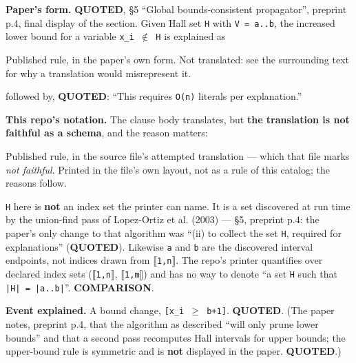 \documentclass[10pt,a4paper]{article}
\newcommand{\provtag}[2]{{\small\sffamily\bfseries\textcolor{#1}{#2}}}
\newenvironment{pubblock}{%
  \par\smallskip
  \def\FrameCommand{\textcolor{litbar}{\vrule width 2.5pt}\hspace{9pt}}%
  \MakeFramed{\advance\hsize-\width\FrameRestore}}%
  {\endMakeFramed\par\smallskip}
\newcommand{\litsub}[1]{\par\smallskip{\sffamily\bfseries\textcolor{litbar}{#1}\par}}
\newcommand{\rulekind}[1]{\par{\small\sffamily\textcolor{litbar}{#1}\par}}
\newcommand{\litline}[1]{\noindent
  \resizebox{\ifdim\width>\linewidth\linewidth\else\width\fi}{!}{#1}\par}
\begin{document}
\begin{pubblock}
\par\smallskip
\litsub{Rule 2 --- bounds-consistent propagator (Hall interval)}
\textbf{Paper's form.} \provtag{tagquoted}{QUOTED}, \S{}5 ``Global bounds-consistent propagator'', preprint p.4, final display of the section. Given Hall set \texttt{H} with \texttt{V = a..b}, the increased lower bound for a variable \texttt{x\_i $\notin$ H} is explained as

\rulekind{Published rule, in the paper's own form. Not translated: see the surrounding text for why a translation would misrepresent it.}
{\raggedright
\litline{\ttfamily\small [x\_i $\geq$ a] $\wedge$ $\bigwedge$\_\{h$\in$H\} ([x\_h $\geq$ a] $\wedge$ [x\_h $\leq$ b]) $\rightarrow$ [x\_i $\geq$ b + 1].}
\par}
followed by, \provtag{tagquoted}{QUOTED}: ``This requires \texttt{O(n)} literals per explanation.''

\textbf{This repo's notation.} The clause body translates, but \textbf{the translation is not faithful as a schema}, and the reason matters:

\rulekind{Published rule, in the source file's attempted translation --- which that file marks \emph{not faithful}. Printed in the file's own layout, not as a rule of this catalog; the reasons follow.}
{\raggedright
\litline{\ttfamily\small X\_i $\geq$ a,~~X\_h $\geq$ a,~~X\_h $\leq$ b,~~$\forall$h $\in$ H}
\litline{\ttfamily\small ------------------------------- $\vdash$~~~~~~~~(BC)}
\litline{\ttfamily\small X\_i $\geq$ b+1}
\par}
\texttt{H} here is \textbf{not} an index set the printer can name. It is a set discovered at run time by the union-find pass of Lopez-Ortiz et al. (2003) --- \S{}5, preprint p.4: the paper's only change to that algorithm was ``(ii) to collect the set \texttt{H}, required for explanations'' (\provtag{tagquoted}{QUOTED}). Likewise \texttt{a} and \texttt{b} are the discovered interval endpoints, not indices drawn from \texttt{$\llbracket$1,n$\rrbracket$}. The repo's printer quantifies over declared index sets (\texttt{$\llbracket$1,n$\rrbracket$}, \texttt{$\llbracket$1,m$\rrbracket$}) and has no way to denote ``a set \texttt{H} such that \texttt{|H| = |a..b|}''. \provtag{tagcomparison}{COMPARISON}.

\textbf{Event explained.} A bound change, \texttt{[x\_i $\geq$ b+1]}. \provtag{tagquoted}{QUOTED}. (The paper notes, preprint p.4, that the algorithm as described ``will only prune lower bounds'' and that a second pass recomputes Hall intervals for upper bounds; the upper-bound rule is symmetric and is \textbf{not} displayed in the paper. \provtag{tagquoted}{QUOTED}.)


\end{pubblock}
\end{document}
